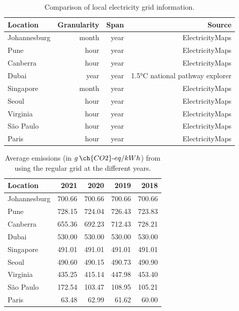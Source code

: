 \begin{table}[h]  
\caption{Comparison of local electricity grid  information. }\label{tab:grid_emissions_hist} \centering  
  \begin{tabular}{|l|r|r|r|}
    \hline
    
  \textbf{Location} &   \textbf{Granularity} & \textbf{Span} & \textbf{Source} \\
  \hline
  Johannesburg & month & year & ElectricityMaps  \\
  \hline
  Pune  & hour & year & ElectricityMaps  \\
  \hline
  Canberra  & hour &  year & ElectricityMaps \\
  \hline
  Dubai    & year & year & 1.5°C national pathway explorer  \\                       
  \hline
  Singapore & month & year & ElectricityMaps \\
  \hline     
  Seoul     & hour & year & ElectricityMaps \\
  \hline
  Virginia  &  hour & year & ElectricityMaps \\
  \hline
  São Paulo & hour & year  & ElectricityMaps \\
  \hline 
  Paris     & hour & year  & ElectricityMaps  \\
  \hline
\end{tabular}  
\end{table}


\begin{table}[h]
  \caption{Average emissions (in $g\,\ch{CO2}\text{-}eq/kWh$) from using the regular grid at the different years.}\label{tab:grid_emissions_avg_year} \centering
  \begin{tabular}{|l|r|r|r|r|}    
  \hline   
  \textbf{Location} &  \textbf{2021} & \textbf{2020} & \textbf{2019} & \textbf{2018}\\
  \hline
  Johannesburg & 700.66 & 700.66 & 700.66 & 700.66  \\
  \hline
  Pune & 728.15 & 724.04 & 726.43 & 723.83     \\
  \hline
  Canberra & 655.36 & 692.23 & 712.43 & 728.21\\
  \hline
  Dubai & 530.00  & 530.00 & 530.00 & 530.00     \\
  \hline
  Singapore & 491.01 & 491.01 & 491.01 & 491.01 \\
  \hline     
  Seoul & 490.60 & 490.15 & 490.73 & 490.90     \\
  \hline
  Virginia  & 435.25 & 415.14 & 447.98 & 453.40 \\
  \hline
  São Paulo &  172.54 &  103.47 & 108.95 &  105.21 \\
  \hline 
  Paris &  63.48  & 62.99 & 61.62   & 60.00   \\
  \hline

\end{tabular}  
\end{table}


